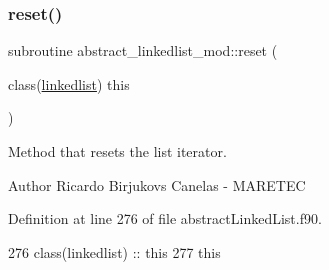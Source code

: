 \subsubsection{\texorpdfstring{reset()}{reset()}}
{\footnotesize\ttfamily subroutine abstract\+\_\+linkedlist\+\_\+mod\+::reset (\begin{DoxyParamCaption}\item[{class(\mbox{\hyperlink{structabstract__linkedlist__mod_1_1linkedlist}{linkedlist}})}]{this }\end{DoxyParamCaption})\hspace{0.3cm}{\ttfamily [private]}}



Method that resets the list iterator. 

\begin{DoxyAuthor}{Author}
Ricardo Birjukovs Canelas -\/ M\+A\+R\+E\+T\+EC 
\end{DoxyAuthor}


Definition at line 276 of file abstract\+Linked\+List.\+f90.


\begin{DoxyCode}
276     \textcolor{keywordtype}{class}(linkedlist) :: this
277     this%
\end{DoxyCode}
